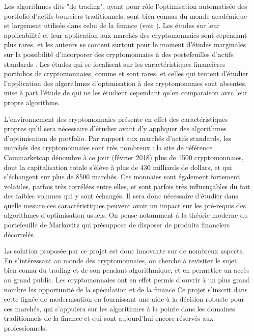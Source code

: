 \documentclass[a4paper]{article}
\begin{document}
Les algorithmes dits "de trading", ayant pour rôle l'optimisation automatisée des portfolio d'actifs boursiers traditionnels, sont bien connus du monde académique et largement utilisée dans celui de la finance (voir \cite{Li2014}). Les études sur leur applicabilité et leur application aux marchés des cryptomonnaies sont cependant plus rares, et les auteurs se content surtout pour le moment d'études marginales sur la possibilité d'incorporer des cryptomonnaies à des portefeuilles d'actifs standards \cite{Elendner2018}. Les études qui se focalisent sur les caractéristiques financières portfolios de cryptomonnaies, comme \cite{KuoChuen17} et \cite{Chen2018} sont rares, et celles qui tentent d'étudier l'application des algorithmes d'optimisation à des cryptomonnaies sont absentes, mise à part l'étude de \citet{Jiang2017} qui ne les étudient cependant qu'en comparaison avec leur propre algorithme.

L'environnement des cryptomonnaies présente en effet des caractéristiques propres qu'il sera nécessaire d'étudier avant d'y appliquer des algorithmes d'optimisation de portfolio. Par rapport aux marchés d'actifs standards, les marchés des cryptomonnaies sont très nombreux : la site de référence Coinmarketcap dénombre à ce jour (février 2018) plus de 1500 cryptomonnaies, dont la capitalisation totale s'élève à plus de 430 milliards de dollars, et qui s'échangent sur plus de 8500 marchés. Ces monnaies sont également fortement volatiles, parfois très corrélées entre elles, et sont parfois très influençables du fait des faibles volumes qui y sont échangés. Il sera donc nécessaire d'étudier dans quelle mesure ces caractéristiques peuvent avoir un impact sur les pré-requis des algorithmes d'optimisation usuels. On pense notamment à la théorie moderne du portefeuille de Markovitz qui présuppose de disposer de produits financiers décorrelés.

La solution proposée par ce projet est donc innovante sur de nombreux aspects. En s'intéressant au monde des cryptomonnaies, on cherche à revisiter le sujet bien connu du trading et de son pendant algorithmique, et en permettre un accès au grand public. Les cryptomonnaies ont en effet permis d'ouvrir à un plus grand nombre les opportunité de la spéculation et de la finance Ce projet s'inscrit dans cette lignée de modernisation en fournissant une aide à la décision robuste pour ces marchés, qui s'appuiera sur les algorithmes à la pointe dans les domaines traditionnels de la finance et qui sont aujourd'hui encore réservés aux professionnels.
\end{document}
